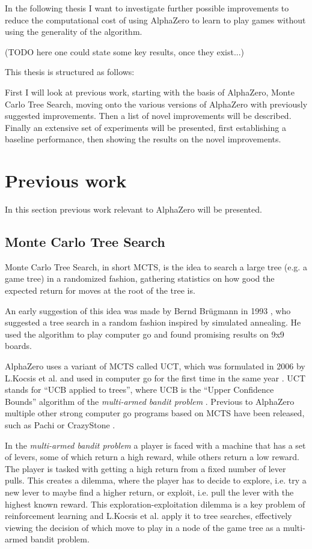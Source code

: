 \documentclass[12pt,onecolumn,oneside,titlepage]{article}
\begin{document}
In the following thesis I want to investigate further possible improvements to reduce the computational cost of using AlphaZero to learn to play games without using the generality of the algorithm.

(TODO here one could state some key results, once they exist...)

This thesis is structured as follows:

First I will look at previous work, starting with the basis of AlphaZero, Monte Carlo Tree Search, moving onto the various versions of AlphaZero with previously suggested improvements.
Then a list of novel improvements will be described. Finally an extensive set of experiments will be presented, first establishing a baseline performance, then showing the results on the novel improvements.


\section{Previous work}

In this section previous work relevant to AlphaZero will be presented.

\subsection{Monte Carlo Tree Search}
\label{s:mcts}

Monte Carlo Tree Search, in short MCTS, is the idea to search a large tree (e.g. a game tree) in a randomized fashion, gathering statistics on how good the expected return for moves at the root of the tree is.

An early suggestion of this idea was made by Bernd Brügmann in 1993 \cite{montecarlogo1993}, who suggested a tree search in a random fashion inspired by simulated annealing. He used the algorithm to play computer go and found promising results on 9x9 boards.

AlphaZero uses a variant of MCTS called UCT, which was formulated in 2006 \cite{kocsis2006bandit} by L.Kocsis et al. and used in computer go for the first time in the same year \cite{gelly2006modification}.
UCT stands for ``UCB applied to trees'', where UCB is the ``Upper Confidence Bounds'' algorithm of the \emph{multi-armed bandit problem} \cite{auer2002finite}. 
Previous to AlphaZero multiple other strong computer go programs based on MCTS have been released, such as Pachi \cite{pachi_github} or CrazyStone \cite{crazystone}.


In the \emph{multi-armed bandit problem} a player is faced with a machine that has a set of levers, some of which return a high reward, while others return a low reward. The player is tasked with getting a high return from a fixed number of lever pulls.
This creates a dilemma, where the player has to decide to explore, i.e. try a new lever to maybe find a higher return, or exploit, i.e. pull the lever with the highest known reward. This exploration-exploitation dilemma is a key problem of reinforcement learning
and L.Kocsis et al. \cite{kocsis2006bandit} apply it to tree searches, effectively viewing the decision of which move to play in a node of the game tree as a multi-armed bandit problem.
\end{document}
